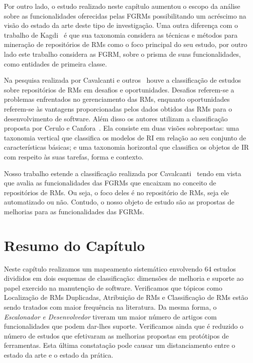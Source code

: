 Por outro lado, o estudo realizado neste capítulo aumentou o escopo da análise
sobre as funcionalidades oferecidas pelas FGRMs possibilitando um acréscimo na
visão do estado da arte deste tipo de investigação. Uma outra diferença com o
trabalho de Kagdi~\cite{kagdi2012assigning} é que sua taxonomia considera as
técnicas e métodos para mineração de repositórios de RMs como o foco principal
do seu estudo, por outro lado este trabalho considera as FGRM, sobre o prisma
de suas funcionalidades, como entidades de primeira classe.

Na pesquisa realizada por Cavalcanti e outros~\cite{cavalcanti2014challenges}
houve a classificação de estudos sobre repositórios de RMs em desafios e
oportunidades. Desafios referem-se a problemas enfrentados no gerenciamento das
RMs, enquanto oportunidades referem-se às vantagens proporcionadas pelos dados
obtidos das  RMs para o desenvolvimento de software. Além disso os autores
utilizam a classificação proposta por Cerulo e
Canfora~\cite{cerulo2004taxonomy}. Ela consiste em duas visões sobrepostas: uma
taxonomia vertical que classifica os modelos de RI em relação ao seu conjunto
de características básicas; e uma taxonomia horizontal que classifica os
objetos de IR com respeito às suas tarefas, forma e contexto.

Nosso trabalho estende a classificação realizada por
Cavalcanti~\cite{cavalcanti2014challenges} tendo em vista que avalia as
funcionalidades das FGRMs que encaixam no conceito de repositórios de RMs. Ou
seja, o foco deles é no repositório de RMs, seja ele automatizado ou não.
Contudo, o nosso objeto de estudo são as propostas de melhorias para as
funcionalidades das FGRMs.

\section{Resumo do Capítulo}\label{sec:resumo_capitulo}

Neste capítulo realizamos um mapeamento sistemático envolvendo 64 estudos
divididos em dois esquemas de classificação: dimensões de melhoria e suporte ao
papel exercido na manutenção de software. Verificamos que tópicos como
Localização de RMs Duplicadas, Atribuição de RMs e Classificação de RMs estão
sendo tratados com maior frequência na literatura. Da mesma forma, o
\textit{Escalonador e Desenvolvedor} tiveram um maior número de artigos com
funcionalidades que podem dar-lhes suporte. Verificamos ainda que é reduzido o
número de estudos que efetivaram as melhorias propostas em protótipos de
ferramentas. Esta última constatação pode causar um distanciamento entre o
estado da arte e o estado da prática.